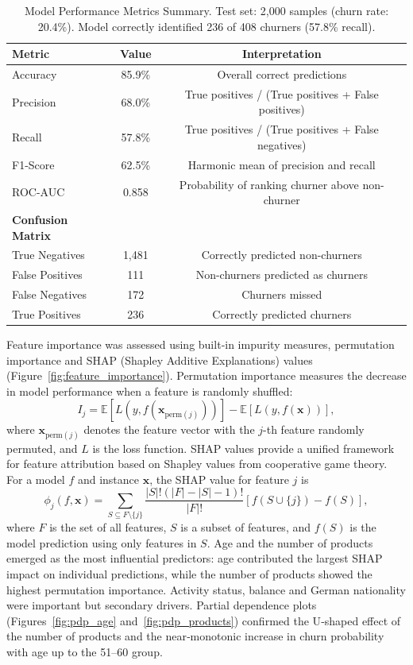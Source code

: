 \documentclass[12pt]{article}
\begin{document}
\begin{table}[H]
\centering
\caption{Model Performance Metrics Summary. Test set: 2,000 samples (churn rate: 20.4\%). Model correctly identified 236 of 408 churners (57.8\% recall).}
\label{tab:model_performance}
\begin{tabular}{lcc}
\toprule
\textbf{Metric} & \textbf{Value} & \textbf{Interpretation} \\
\midrule
Accuracy & 85.9\% & Overall correct predictions \\
Precision & 68.0\% & True positives / (True positives + False positives) \\
Recall & 57.8\% & True positives / (True positives + False negatives) \\
F1-Score & 62.5\% & Harmonic mean of precision and recall \\
ROC-AUC & 0.858 & Probability of ranking churner above non-churner \\
\midrule
\textbf{Confusion Matrix} & & \\
\phantom{---} True Negatives & 1,481 & Correctly predicted non-churners \\
\phantom{---} False Positives & 111 & Non-churners predicted as churners \\
\phantom{---} False Negatives & 172 & Churners missed \\
\phantom{---} True Positives & 236 & Correctly predicted churners \\
\bottomrule
\end{tabular}
\end{table}

Feature importance was assessed using built‑in impurity measures, permutation importance and SHAP (Shapley Additive Explanations) values (Figure~\ref{fig:feature_importance}).  Permutation importance measures the decrease in model performance when a feature is randomly shuffled:
\[ I_j = \mathbb{E}[L(y, f(\mathbf{x}_{\text{perm}(j)}))] - \mathbb{E}[L(y, f(\mathbf{x}))], \]
where \(\mathbf{x}_{\text{perm}(j)}\) denotes the feature vector with the \(j\)-th feature randomly permuted, and \(L\) is the loss function.  SHAP values provide a unified framework for feature attribution based on Shapley values from cooperative game theory.  For a model \(f\) and instance \(\mathbf{x}\), the SHAP value for feature \(j\) is
\[ \phi_j(f, \mathbf{x}) = \sum_{S \subseteq F \setminus \{j\}} \frac{|S|!(|F| - |S| - 1)!}{|F|!} [f(S \cup \{j\}) - f(S)], \]
where \(F\) is the set of all features, \(S\) is a subset of features, and \(f(S)\) is the model prediction using only features in \(S\).  Age and the number of products emerged as the most influential predictors: age contributed the largest SHAP impact on individual predictions, while the number of products showed the highest permutation importance.  Activity status, balance and German nationality were important but secondary drivers.  Partial dependence plots (Figures~\ref{fig:pdp_age} and~\ref{fig:pdp_products}) confirmed the U‑shaped effect of the number of products and the near‑monotonic increase in churn probability with age up to the 51–60 group.
\end{document}
